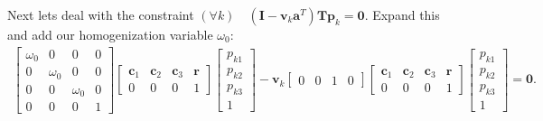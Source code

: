 \documentclass{article}
\begin{document}
Next lets deal with the constraint $(\forall k) \quad (\mathbf{I} - \mathbf{v}_k \mathbf{a}^T) \mathbf{T} \mathbf{p}_k = \mathbf{0}$. Expand this and add our homogenization variable $\omega_0$:
\begin{align}
    \begin{bmatrix} \omega_0 & 0 & 0 & 0 \\ 0 & \omega_0 & 0 & 0 \\ 0 & 0 & \omega_0 & 0 \\ 0 & 0 & 0 & 1\end{bmatrix}\begin{bmatrix} \mathbf{c}_1 & \mathbf{c}_2 & \mathbf{c}_3 & \mathbf{r} \\ 0 & 0 & 0 & 1\end{bmatrix} \begin{bmatrix} p_{k1} \\ p_{k2} \\ p_{k3} \\ 1 \end{bmatrix} - \mathbf{v}_k \begin{bmatrix} 0 & 0 & 1 & 0 \end{bmatrix} \begin{bmatrix} \mathbf{c}_1 & \mathbf{c}_2 & \mathbf{c}_3 & \mathbf{r} \\ 0 & 0 & 0 & 1\end{bmatrix} \begin{bmatrix} p_{k1} \\ p_{k2} \\ p_{k3} \\ 1 \end{bmatrix} = \mathbf{0}.
\end{align}
\end{document}
